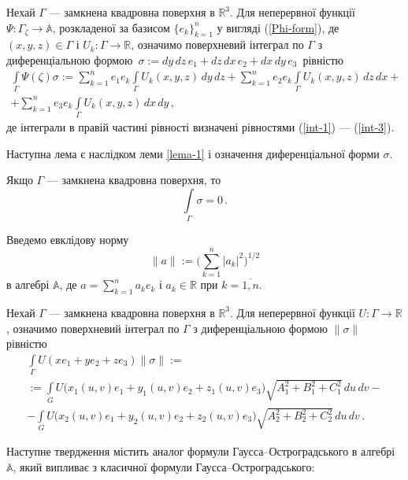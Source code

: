 \documentclass[11pt, reqno]{amsart}
\begin{document}
Нехай $\Gamma$ --- замкнена квадровна поверхня в $\mathbb{R}^{3}$.
Для неперервної функції $\Psi:\Gamma_{\zeta}\rightarrow
\mathbb{A}$, розкладеної за базисом $\{e_{k}\}_{k=1}^{n}$
у вигляді (\ref{Phi-form}), де $(x,y,z)\in\Gamma$ і
$U_k : \Gamma\rightarrow\mathbb{R}$, означимо поверхневий інтеграл по
$\Gamma$ з диференціальною формою\,
$\sigma:=dy\,dz\,e_1+dz\,dx\,e_{2}+dx\,dy\,e_{3}$\, рівністю
\begin{multline*}
 \int\limits_{\Gamma}\Psi(\zeta)\sigma:=
 \sum\limits_{k=1}^{n}e_1e_{k}\int\limits_{\Gamma}U_{k}(x,y,z)\,dy\,dz+
\sum\limits_{k=1}^{n}e_{2}e_{k}\int\limits_{\Gamma}U_{k}(x,y,z)\,dz\,dx+\\
+\sum\limits_{k=1}^{n}e_{3}e_{k}\int\limits_{\Gamma}U_{k}(x,y,z)\,dx\,dy\,,
\end{multline*}
де інтеграли в правій частині рівності визначені рівностями
(\ref{int-1}) --- (\ref{int-3}).


Наступна лема є наслідком леми \ref{lema-1} і означення диференціальної форми
$\sigma$.\vskip 2mm


\begin{lemma}\label{lema-2}
Якщо $\Gamma$ --- замкнена квадровна поверхня, то
\begin{equation}\label{int-sigma}
\int\limits_{\Gamma}\sigma=0\,.
\end{equation}
\end{lemma}
\vskip 2mm

Введемо евклідову норму
\[\|a\|:=\biggl(\sum\limits_{k=1}^n|a_k|^2\biggr)^{1/2}\] 
в алгебрі $\mathbb{A}$, де $a=\sum\limits_{k=1}^na_k e_k$ і
$a_k\in\mathbb{R}$ при $k=\overline{1,n}$.

Нехай $\Gamma$ --- замкнена квадровна поверхня в $\mathbb{R}^{3}$.
Для неперервної функції $U : \Gamma\rightarrow \mathbb{R}$,
означимо поверхневий інтеграл по $\Gamma$ з диференціальною
формою $\|\sigma\|$ рівністю 
\begin{multline*}
\int\limits_{\Gamma}U(xe_1+ye_{2}+ze_{3})\|\sigma\|:=\\
:=\int\limits_{G}U\Big(x_1(u,v)e_1
+y_1(u,v)e_{2}+z_1(u,v)e_{3}\Big) \sqrt{A_1^2+B_1^2+C_1^2}\,du\,dv-\\
-\int\limits_{G}U\Big(x_2(u,v)e_1
+y_2(u,v)e_{2}+z_2(u,v)e_{3}\Big)
\sqrt{A_2^2+B_2^2+C_2^2}\,du\,dv\,.
\end{multline*}


Наступне твердження містить аналог
формули Гаусса--Остро\-град\-сько\-го в алгебрі $\mathbb{A}$, який випливає з
класичної формули Гаусса--Остроградського:
\end{document}

